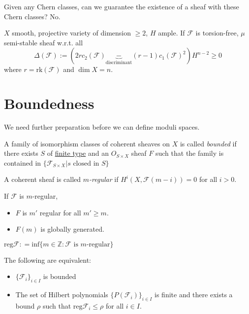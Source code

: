 Given any Chern classes, can we guarantee the existence of a sheaf with these
Chern classes? No.

\begin{theorem}
\label{theorem-Bogomolov}
$X$ smooth, projective variety of dimension $\geq 2$, $H$ ample. If
$\mathcal{F}$ is torsion-free, $\mu$ semi-stable sheaf w.r.t. all
$$
\Delta(\mathcal{F}):=(2rc_2(\mathcal{F})\underbrace{-}_{\text{discriminant}}
(r-1)c_1(\mathcal{F})^2)H^{n-2}\geq 0
$$
where $r=\text{rk}(\mathcal{F})$ and $\dim X=n$.
\end{theorem}

\section*{Boundedness}
\label{section-boundedness}

We need further preparation before we can define moduli spaces.

\begin{definition}
\label{definition-bounded-family}
A family of isomorphism classes of coherent sheaves on $X$ is called {\it
bounded} if there exists $S$ of \underline{finite type} and an $O_{S \times X}$
sheaf $F$ such that the family is contained in $\{ \mathcal{F}_{S \times X}|s
\text{ closed in }S\}$
\end{definition}

\begin{definition}
\label{definition-m-regularity}
A coherent sheaf is called {\it $m$-regular} if $H^{i}(X,\mathcal{F}(m-i))=0$
for all $i>0$.
\end{definition}

\begin{proposition}
\label{proposition-m-regularity}
If $\mathcal{F}$ is $m$-regular,
\begin{itemize}
\item $F$ is $m'$ regular for all $m' \geq m$.
\item $F(m)$ is globally generated.
\end{itemize}
\end{proposition}

\begin{definition}
\label{definition-regular-infimum}
$\text{reg}\mathcal{F}:
=\text{inf}\{m \in \mathbb{Z}:\mathcal{F}\text{ is $m$-regular}\}$
\end{definition}

\begin{lemma}
\label{lemma-}
The following are equivalent:
\begin{itemize}
\item $\{\mathcal{F}_i\}_{i \in I}$ is bounded
\item The set of Hilbert polynomials $\{P(\mathcal{F}_i)\}_{i \in I}$ is finite
and there exists a bound $\rho$ such that $\text{reg}\mathcal{F}_i\leq \rho$ for
all $i \in I$.
\end{itemize}
\end{lemma}

